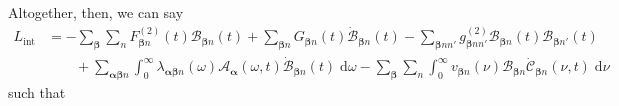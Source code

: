 \documentclass{article}
\begin{document}
Altogether, then, we can say
\begin{equation}
\begin{split}
L_\mathrm{int} &= -\sum_{\bm{\beta}}\sum_{n}F_{\bm{\beta}n}^{(2)}(t)\mathcal{B}_{\bm{\beta}n}(t) + \sum_{\bm{\beta}n}G_{\bm{\beta}n}(t)\dot{\mathcal{B}}_{\bm{\beta}n}(t) - \sum_{\bm{\beta}nn'}g_{\bm{\beta}nn'}^{(2)}\mathcal{B}_{\bm{\beta}n}(t)\mathcal{B}_{\bm{\beta}n'}(t)\\
&\qquad + \sum_{\bm{\alpha}\bm{\beta}n}\int_0^\infty\lambda_{\bm{\alpha}\bm{\beta}n}(\omega)\mathcal{A}_{\bm{\alpha}}(\omega,t)\dot{\mathcal{B}}_{\bm{\beta}n}(t)\;\mathrm{d}\omega - \sum_{\bm{\beta}}\sum_{n}\int_0^\infty v_{\bm{\beta}n}(\nu)\mathcal{B}_{\bm{\beta}n}\dot{\mathcal{C}}_{\bm{\beta}n}(\nu,t)\;\mathrm{d}\nu
\end{split}
\end{equation}
such that
\end{document}
